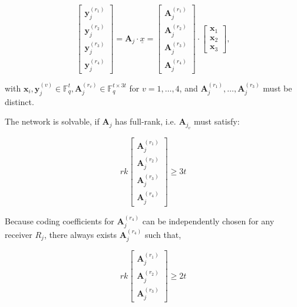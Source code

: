 \[
\left[\begin{array}{c}
\boldsymbol{y}_{j}^{\left(r_{1}\right)}\\
\boldsymbol{y}_{j}^{\left(r_{2}\right)}\\
\boldsymbol{y}_{j}^{\left(r_{3}\right)}\\
\boldsymbol{y}_{j}^{\left(r_{4}\right)}
\end{array}\right]=\boldsymbol{A}_{j}\cdot\underline{x}=\left[\begin{array}{c}
\boldsymbol{A}_{j}^{\left(r_{1}\right)}\\
\boldsymbol{A}_{j}^{\left(r_{2}\right)}\\
\boldsymbol{A}_{j}^{\left(r_{3}\right)}\\
\boldsymbol{A}_{j}^{\left(r_{4}\right)}
\end{array}\right]\cdot\left[\begin{array}{c}
\boldsymbol{x}_{1}\\
\boldsymbol{x}_{2}\\
\boldsymbol{x}_{3}
\end{array}\right],
\]

with $\boldsymbol{x}_{i},\boldsymbol{y}_{j}^{\left(v\right)}\in\ensuremath{\mathbb{F}}_{q}^{t},\boldsymbol{A}_{j}^{\left(r_{v}\right)}\in\ensuremath{\mathbb{F}}_{q}^{t\times3t}$
for $v=1,\ldots,4$, and $\boldsymbol{A}_{j}^{\left(r_{1}\right)},\ldots,\boldsymbol{A}_{j}^{\left(r_{3}\right)}$
must be distinct.

The network is solvable, if $\boldsymbol{A}_{j}$ has full-rank, i.e.
$\boldsymbol{A}_{j_{v}}$ must satisfy:

\[
rk\left[\begin{array}{c}
\boldsymbol{A}_{j}^{\left(r_{1}\right)}\\
\boldsymbol{A}_{j}^{\left(r_{2}\right)}\\
\boldsymbol{A}_{j}^{\left(r_{3}\right)}\\
\boldsymbol{A}_{j}^{\left(r_{4}\right)}
\end{array}\right]\geq3t
\]

Because coding coefficients for $\boldsymbol{A}_{j}^{\left(r_{4}\right)}$
can be independently chosen for any receiver $R_{j}$, there always
exists $\boldsymbol{A}_{j}^{\left(r_{4}\right)}$ such that,

\begin{equation}
rk\left[\begin{array}{c}
\boldsymbol{A}_{j}^{\left(r_{1}\right)}\\
\boldsymbol{A}_{j}^{\left(r_{2}\right)}\\
\boldsymbol{A}_{j}^{\left(r_{3}\right)}
\end{array}\right]\geq2t\label{eq:rk_rqm_e1l1h3s4}
\end{equation}


